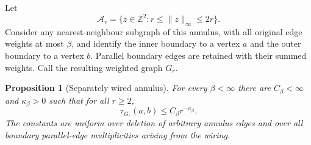 \documentclass[11pt]{article}
\newtheorem{proposition}[theorem]{Proposition}
\theoremstyle{definition}
\theoremstyle{remark}
\newcommand{\ZZ}{\mathbb Z}
\newcommand{\1}{\mathbf 1}
\begin{document}
Let
\begin{equation}
 \mathcal A_r=\{z\in\ZZ^2:r\le\|z\|_\infty\le2r\}.
\end{equation}
Consider any nearest-neighbour subgraph of this annulus, with all original edge
weights at most $\beta$, and identify the inner boundary to a vertex $a$ and the outer
boundary to a vertex $b$.  Parallel boundary edges are retained with their summed
weights.  Call the resulting weighted graph $G_r$.

\begin{proposition}[Separately wired annulus]\label{prop:annulus}
For every $\beta<\infty$ there are $C_\beta<\infty$ and $\kappa_\beta>0$ such that
for all $r\ge2$,
\begin{equation}\label{eq:annulus-bound}
 \tau_{G_r}(a,b)\le C_\beta r^{-\kappa_\beta}.
\end{equation}
The constants are uniform over deletion of arbitrary annulus edges and over all
boundary parallel-edge multiplicities arising from the wiring.
\end{proposition}
\end{document}
